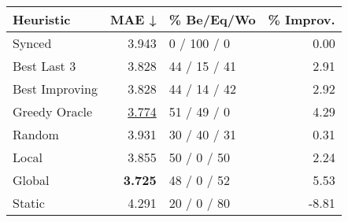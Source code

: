 \begin{tabular}{lrlr}
\toprule
\textbf{Heuristic} & \textbf{MAE ↓} & \textbf{\% Be/Eq/Wo} & \textbf{\% Improv.} \\
\midrule
            Synced &          3.943 &          0 / 100 / 0 &                0.00 \\
\midrule
       Best Last 3 &          3.828 &         44 / 15 / 41 &                2.91 \\
    Best Improving &          3.828 &         44 / 14 / 42 &                2.92 \\
\addlinespace
     Greedy Oracle &          \underline{3.774} &          51 / 49 / 0 &                4.29 \\
            Random &          3.931 &         30 / 40 / 31 &                0.31 \\
\midrule
             Local &          3.855 &          50 / 0 / 50 &                2.24 \\
            Global &          \textbf{3.725} &          48 / 0 / 52 &                5.53 \\
\midrule
            Static &          4.291 &          20 / 0 / 80 &               -8.81 \\
\bottomrule
\end{tabular}

\label{tab:ds_iid_lr05_le1_bs2_Summary}
